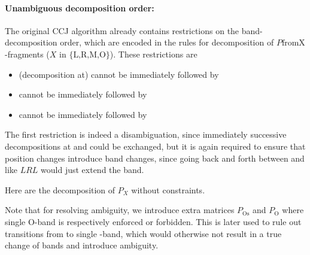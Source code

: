 \documentclass[11pt]{article} %
\newcommand{\Ob}{\text{O}}
\newcommand{\Rb}{\text{R}}
\newcommand{\Lb}{\text{L}}
\newcommand{\Mb}{\text{M}}
\newcommand{\POnone}{P_{\text{O}}}
\newcommand{\POSnone}{P_{\text{Os}}}
\begin{document}
\paragraph{Unambiguous decomposition order:}
The original CCJ algorithm already contains restrictions on the band-decomposition order, which are encoded in the rules for decomposition of $P\text{fromX}$-fragments ($X$ in $\{\text{L,R,M,O}\}$). These restrictions are
\begin{itemize}
\item (decomposition at) \Rb{} cannot be immediately followed by \Lb
\item \Mb{} cannot be immediately followed by \Ob{} 
\item \Ob{} cannot be immediately followed by \Mb
\end{itemize} 

The first restriction is indeed a disambiguation, since immediately successive decompositions at \Lb{} and \Rb{} could be exchanged, but it is again required to ensure that position changes introduce band changes, since going back and forth between \Lb{} and \Rb{} like $LRL$ would just extend the \Lb{} band. 


Here are the decomposition of $P_X$ without constraints.

Note that for resolving ambiguity, we introduce extra matrices $\POSnone$ and $\POnone$ where single O-band is respectively enforced or forbidden. This is later used to rule out transitions from \Mb{} to single \Ob-band, which would otherwise not result in a true change of bands and introduce ambiguity.
\end{document}
